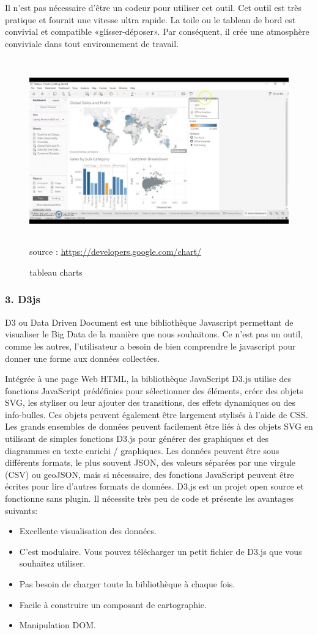 \documentclass[french, a4paper, 12pt]{report}
\begin{document}
Il n’est pas nécessaire d’être un codeur pour utiliser cet outil. Cet outil est très pratique et fournit une vitesse ultra rapide. La toile ou le tableau de bord est convivial et compatible «glisser-déposer». Par conséquent, il crée une atmosphère conviviale dans tout environnement de travail.
\begin{figure}[!htp]
    \centering
    \includegraphics[height=8cm]{images/tableau.jpg}
    \scriptsize{source : \url{https://developers.google.com/chart/}}
    \caption{tableau charts}
    \label{fig:2.14}
\end{figure}
\subsubsection{3. D3js}
D3 ou Data Driven Document est une bibliothèque Javascript permettant de visualiser le Big Data de la manière que nous souhaitons. Ce n'est pas un outil, comme les autres, l'utilisateur a besoin de bien comprendre le javascript pour donner une forme aux données collectées. 

Intégrée à une page Web HTML, la bibliothèque JavaScript D3.js utilise des fonctions JavaScript prédéfinies pour sélectionner des éléments, créer des objets SVG, les styliser ou leur ajouter des transitions, des effets dynamiques ou des info-bulles. Ces objets peuvent également être largement stylisés à l'aide de CSS. Les grands ensembles de données peuvent facilement être liés à des objets SVG en utilisant de simples fonctions D3.js pour générer des graphiques et des diagrammes en texte enrichi / graphiques. Les données peuvent être sous différents formats, le plus souvent JSON, des valeurs séparées par une virgule (CSV) ou geoJSON, mais si nécessaire, des fonctions JavaScript peuvent être écrites pour lire d'autres formats de données.
D3.js est un projet open source et fonctionne sans plugin. Il nécessite très peu de code et présente les avantages suivants:
\begin{itemize}
    \item Excellente visualisation des données.
    \item C'est modulaire. Vous pouvez télécharger un petit fichier de D3.js que vous souhaitez utiliser.
    \item Pas besoin de charger toute la bibliothèque à chaque fois.
    \item Facile à construire un composant de cartographie.
    \item Manipulation DOM.
\end{itemize}
\end{document}
